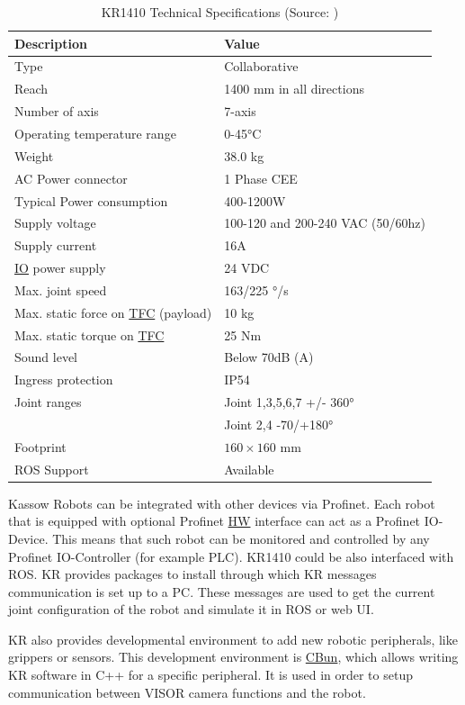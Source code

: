 \begin{table}[h!]
    \centering
    \small
    \renewcommand{\arraystretch}{1.2} %
    \begin{tabular}{ll}
        \textbf{Description} & \textbf{Value} \\ \hline
        Type & Collaborative \\
        Reach & 1400 mm in all directions\\
        Number of axis & 7-axis \\
        Operating temperature range & 0-45°C\\ 
        Weight & 38.0 kg \\ 
        AC Power connector & 1 Phase CEE \\ 
        Typical Power consumption & 400-1200W \\ 
        Supply voltage & 100-120 and 200-240 VAC (50/60hz) \\ 
        Supply current & 16A\\ 
        \hyperref[acro:IO]{IO} power supply & 24 VDC\\ 
        Max. joint speed  & 163/225 °/s\\ 
        Max. static force on \hyperref[acro:TFC]{TFC} (payload) & 10 kg\\ 
        Max. static torque on \hyperref[acro:TFC]{TFC} & 25 Nm\\ 
        Sound level & Below 70dB (A) \\ 
        Ingress protection & IP54 \\ 
        Joint ranges & Joint 1,3,5,6,7 +/- 360° \\
        & Joint 2,4 -70/+180° \\ 
        Footprint& $160 \times 160$ mm \\ 
        ROS Support & Available \\ \hline
    \end{tabular}
    \caption{KR1410 Technical Specifications (Source: \cite[page 31]{kassow-specification})}
\end{table}


Kassow Robots can be integrated with other devices via Profinet. Each robot that is equipped with optional Profinet 
\hyperref[acro:HW]{HW} interface can act as a Profinet IO-Device.
This means that such robot can be monitored and controlled by any Profinet IO-Controller (for example PLC). \cite{profinet}
KR1410 could be also interfaced with ROS. KR provides packages to install through which KR messages communication is set up to a PC.
These messages are used to get the current joint configuration of the robot and simulate it in ROS or web UI.

KR also provides developmental environment to add new robotic peripherals, like grippers or sensors. This development environment is \hyperref[acro:CBun]{CBun},
which allows writing KR software in C++ for a specific peripheral. It is used in order to setup communication between VISOR camera functions and the robot. \cite{Cbun}
